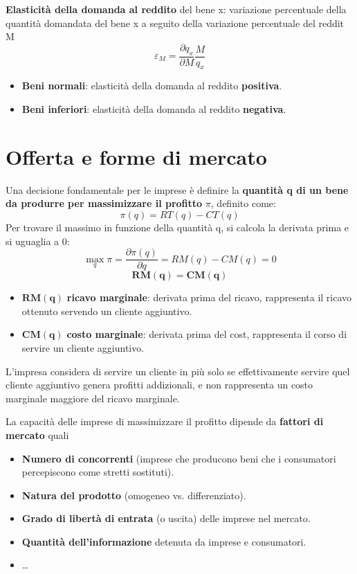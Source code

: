\documentclass[../main.tex]{subfiles}
\begin{document}
\textbf{Elasticità della domanda al reddito} del bene x: variazione percentuale della quantità domandata del bene x a seguito della variazione percentuale del reddit M
$$\varepsilon_M=\frac{\partial q_x}{\partial M} \frac{M}{q_x}$$

\begin{itemize}
\item \textbf{Beni normali}: elasticità della domanda al reddito \textbf{positiva}.
\item \textbf{Beni inferiori}: elasticità della domanda al reddito \textbf{negativa}.
\end{itemize}

\section{Offerta e forme di mercato}

Una decisione fondamentale per le imprese è definire la \textbf{quantità q di un bene da produrre per massimizzare il profitto} $\pi$, definito come:
$$\pi(q) = RT(q) - CT(q)$$
Per trovare il massimo in funzione della quantità q, si calcola la derivata prima e si uguaglia a 0:
$$\max_q \pi = \frac{\partial \pi(q)}{\partial q}=RM(q) - CM(q) = 0$$
$$\mathbf{RM(q) = CM(q)}$$
\begin{itemize}
\item $\mathbf{RM(q)}$ \textbf{ricavo marginale}: derivata prima del ricavo, rappresenta il ricavo ottenuto servendo un cliente aggiuntivo.
\item $\mathbf{CM(q)}$ \textbf{costo marginale}: derivata prima del cost, rappresenta il corso di servire un cliente aggiuntivo.
\end{itemize}

L'impresa considera di servire un cliente in più solo se effettivamente servire quel cliente aggiuntivo genera profitti addizionali, e non rappresenta un costo marginale maggiore del ricavo marginale.

La capacità delle imprese di massimizzare il profitto dipende da \textbf{fattori di mercato} quali
\begin{itemize}
    \item \textbf{Numero di concorrenti} (imprese che producono beni che i consumatori percepiscono come stretti sostituti).
    \item \textbf{Natura del prodotto} (omogeneo vs. differenziato).
    \item \textbf{Grado di libertà di entrata} (o uscita) delle imprese nel mercato.
    \item \textbf{Quantità dell'informazione} detenuta da imprese e consumatori.
    \item \dots
\end{itemize}
\end{document}

